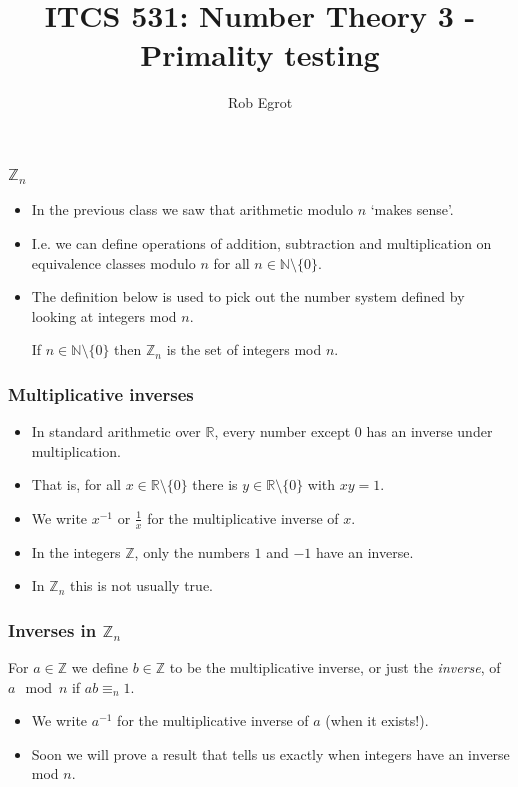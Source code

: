 \documentclass[handout]{beamer}
\title{ITCS 531: Number Theory 3 - Primality testing}
\date{}
\author{Rob Egrot}
\newcommand{\bN}{\mathbb{N}}
\newcommand{\bZ}{\mathbb{Z}}
\newcommand{\bR}{\mathbb{R}}
\begin{document}
\begin{frame}
\titlepage
\end{frame}

\begin{frame}
\frametitle{$\bZ_n$}
\begin{itemize}
\item In the previous class we saw that arithmetic modulo $n$ `makes sense'.
\vspace{0.5cm} 
\item I.e. we can define operations of addition, subtraction and multiplication on equivalence classes modulo $n$ for all $n\in\bN \setminus\{0\}$. 
\vspace{0.5cm} 
\item The definition below is used to pick out the number system defined by looking at integers mod $n$. 
\vspace{0.5cm} 
\begin{definition}[$\bZ_n$]
If $n\in \bN\setminus\{0\}$ then $\bZ_n$ is the set of integers mod $n$.
\end{definition}
\end{itemize}
\end{frame}

\begin{frame}
\frametitle{Multiplicative inverses}
\begin{itemize}
\item In standard arithmetic over $\bR$, every number except $0$ has an inverse under multiplication. 
\vspace{0.5cm} 
\item That is, for all $x\in \bR\setminus\{0\}$ there is $y\in \bR\setminus\{0\}$ with $xy =1$. 
\vspace{0.5cm} 
\item We write $x^{-1}$ or $\frac{1}{x}$ for the multiplicative inverse of $x$. 
\vspace{0.5cm} 
\item In the integers $\bZ$, only the numbers $1$ and $-1$ have an inverse. 
\vspace{0.5cm} 
\item In $\bZ_n$ this is not usually true.
\end{itemize}
\end{frame}

\begin{frame}
\frametitle{Inverses in $\bZ_n$}
\begin{definition} 
For $a\in \bZ$ we define $b\in\bZ$ to be the multiplicative inverse, or just the \emph{inverse}, of $a \mod n$ if  $ab \equiv_n 1$. 


\end{definition}
\vspace{0.5cm} 
\begin{itemize}
\item We write $a^{-1}$ for the multiplicative inverse of $a$ (when it exists!).
\vspace{0.5cm} 
\item Soon we will prove a result that tells us exactly when integers have an inverse mod $n$.
\end{itemize}

\end{frame}
\end{document}
